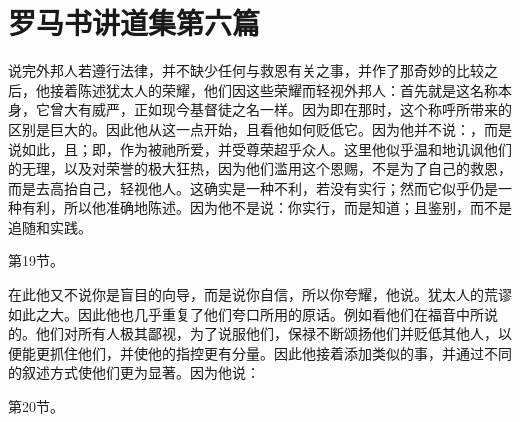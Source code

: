 

\section{罗马书讲道集第六篇}

\par

\par

说完外邦人若遵行法律，并不缺少任何与救恩有关之事，并作了那奇妙的比较之后，他接着陈述犹太人的荣耀，他们因这些荣耀而轻视外邦人：首先就是这名称本身，它曾大有威严，正如现今基督徒之名一样。因为即在那时，这个称呼所带来的区别是巨大的。因此他从这一点开始，且看他如何贬低它。因为他并不说：，而是说如此，且；即，作为被祂所爱，并受尊荣超乎众人。这里他似乎温和地讥讽他们的无理，以及对荣誉的极大狂热，因为他们滥用这个恩赐，不是为了自己的救恩，而是去高抬自己，轻视他人。这确实是一种不利，若没有实行；然而它似乎仍是一种有利，所以他准确地陈述。因为他不是说：你实行，而是知道；且鉴别，而不是追随和实践。\par

第19节。\par

在此他又不说你是盲目的向导，而是说你自信，所以你夸耀，他说。犹太人的荒谬如此之大。因此他也几乎重复了他们夸口所用的原话。例如看他们在福音中所说的。他们对所有人极其鄙视，为了说服他们，保禄不断颂扬他们并贬低其他人，以便能更抓住他们，并使他的指控更有分量。因此他接着添加类似的事，并通过不同的叙述方式使他们更为显著。因为他说：\par

第20节。\par

